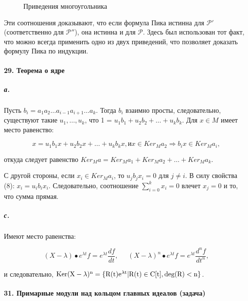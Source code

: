 \documentclass{mai_book}
\begin{document}
{\begin{figure}[h]
\caption{Приведения многоугольника}
\end{figure}



\noindent Эти соотношения доказывают, что если формула Пика истинна для $\mathcal{P}'$ (соответственно для $\mathcal{P}''$), она истинна и для $\mathcal{P}$. Здесь был использован тот факт, что можно всегда применить одно из двух приведений, что позволяет доказать формулу Пика по индукции.

\paragraph{29. Теорема о ядре}

\subparagraph{а.} Пусть $b_{i} = a_{1}a_{2}\ldots a_{i-1}a_{i+1}\ldots a_{k}$. Тогда $b_{i}$ взаимно просты, следовательно, существуют такие $u_{1},\ldots,u_{k}$, что 1 = $u_{1}b_{1}+u_{2}b_{2}+\dots+u_{k}b_{k}$. Для $x \in M$ имеет место равенство:

\begin{equation}
x = u_{1}b_{1}x + u_{2}b_{2}x +\dots+ u_{k}b_{k}x, \text{и} x \in Ker_{M} a_{2} \Rightarrow b_{i}x \in Ker_{M} a_{i},
\end{equation}

\noindent откуда следует равенство $Ker_{M} a = Ker_{M} a_{1} + Ker_{M} a_{2} +\dots+ Ker_{M} a_{k}$.

С другой стороны, если $x_{i} \in Ker_{M} a_{i}$, то $u_{j}b_{j}x_{i} = 0$ для $j \neq i$. В силу свойства (8): $x_{i} = u_{i}b_{i}x_{i}$. Следовательно, соотношение $\sum_{i = 0}^{k}x_{i} = 0$ влечет $x_{j} = 0$ и то, что сумма прямая.




\subparagraph{с.} Имеют место равенства:

\begin{equation*}
(X - \lambda) \bullet e^{\lambda t}f = e^{\lambda t}\frac{df}{dt},\;\;\;\;\; (X - \lambda)^{n} \bullet e^{\lambda t}f = e^{\lambda t}\frac{d^{n}f}{dt^{n}},
\end{equation*}

\noindent и следовательно, $\rm{Ker}(X - \lambda)^{n} = \{R(t)e^{\lambda t} | R(t) \in C[t], deg(R) < n\}$.

\paragraph{31. Примарные модули над кольцом главных идеалов (задача)}

}
\end{document}
